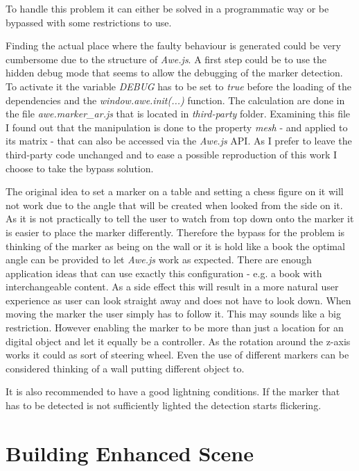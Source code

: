 To handle this problem it can either be solved in a programmatic way or be bypassed with some restrictions to use. 

Finding the actual place where the faulty behaviour is generated could be very cumbersome due to the structure of \textit{Awe.js}. A first step could be to use the hidden debug mode that seems to allow the debugging of the marker detection. To activate it the variable \textit{DEBUG} has to be set to \textit{true} before the loading of the dependencies and the \textit{window.awe.init(...)} function. The calculation are done in the file \textit{awe.marker\_ar.js} that is located in \textit{third-party} folder. Examining this file I found out that the manipulation is done to the property \textit{mesh} - and applied to its matrix - that can also be accessed via the \textit{Awe.js} API. As I prefer to leave the third-party code unchanged and to ease a possible reproduction of this work I choose to take the bypass solution.

The original idea to set a marker on a table and setting a chess figure on it will not work due to the angle that will be created when looked from the side on it. As it is not practically to tell the user to watch from top down onto the marker it is easier to place the marker differently. Therefore the bypass for the problem is thinking of the marker as being on the wall or it is hold like a book the optimal angle can be provided to let \textit{Awe.js} work as expected. There are enough application ideas that can use exactly this configuration - e.g. a book with interchangeable content. As a side effect this will result in a more natural user experience as user can look straight away and does not have to look down. When moving the marker the user simply has to follow it. This may sounds like a big restriction. However enabling the marker to be more than just a location for an digital object and let it equally be a controller. As the rotation around the z-axis works it could as sort of steering wheel. Even the use of different markers can be considered thinking of a wall putting different object to.

It is also recommended to have a good lightning conditions. If the marker that has to be detected is not sufficiently lighted the detection starts flickering.

\section{Building Enhanced Scene }
\label{sec:enhancedScene}

